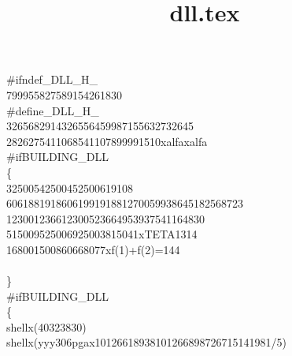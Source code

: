 \documentclass[a4paper, 10pt]{article}
\title{dll.tex}
\newcommand\SPC{\hspace*{0.6em}}
\newcommand\TAB{\hspace*{1.2em}}
\newcommand{\CppAIdentifier}[1]{#1}
\newcommand{\CppANumber}[1]{#1}
\newcommand{\CppAPreprocessor}[1]{\textcolor[rgb]{0,0,1}{#1}}
\newcommand{\CppASpace}[1]{\colorbox[rgb]{1,1,1}{#1}}
\newcommand{\CppASymbol}[1]{#1}
\begin{document}
\begin{ttfamily}
\noindent
\CppAPreprocessor{\#\SPC ifndef\SPC \_DLL\_H\_\SPC \SPC }\\
\CppASpace{\SPC }\CppANumber{799955827589154261830}\\
\CppAPreprocessor{\#define\SPC \_DLL\_H\_\SPC }\\
\CppASpace{\SPC }\CppANumber{3265682914326556459987155632732645}\\
\CppASpace{\SPC \SPC \SPC \SPC \SPC }\CppANumber{2826275411068541107899991510}\CppASpace{\SPC }\CppAIdentifier{x}\CppASpace{\SPC }\CppAIdentifier{alfa}\CppASpace{\SPC }\CppAIdentifier{x}\CppASpace{\SPC }\CppAIdentifier{alfa}\\
\CppAPreprocessor{\#if\SPC BUILDING\_DLL}\\
\CppASymbol{\{}\\
\CppASpace{\SPC \SPC \SPC \SPC }\CppANumber{32500542500452500619108}\\
\CppASpace{\SPC \SPC \SPC \SPC \SPC \SPC \SPC }\CppANumber{6061881918606199191881270059938645182568723}\\
\CppASpace{\SPC \SPC \SPC \SPC \SPC \SPC \SPC \SPC \SPC \SPC }\CppANumber{123001236612300523664953937541164830}\\
\CppASpace{\SPC \SPC \SPC \SPC \SPC \SPC \SPC \SPC \SPC \SPC \SPC \SPC }\CppANumber{515009525006925003815041}\CppASpace{\SPC }\CppAIdentifier{x}\CppASpace{\SPC }\CppAIdentifier{TETA}\CppASpace{\SPC }\CppANumber{1314}\\
\CppASpace{\SPC \SPC \SPC \SPC \SPC \SPC \SPC \SPC \SPC \SPC \SPC \SPC \SPC \SPC \SPC \SPC }\CppANumber{168001500860668077}\CppASpace{\SPC }\CppAIdentifier{x}\CppASpace{\SPC }\CppAIdentifier{f}\CppASymbol{(}\CppANumber{1}\CppASymbol{)}\CppASymbol{+}\CppAIdentifier{f}\CppASymbol{(}\CppANumber{2}\CppASymbol{)}\CppASymbol{=}\CppANumber{144}\\
\CppASpace{\SPC \SPC \SPC \SPC \SPC \SPC \SPC \SPC \SPC \SPC \SPC \SPC \SPC \SPC \SPC \SPC }\\
\CppASpace{\SPC \SPC \SPC \SPC \SPC \SPC \SPC \SPC \SPC \SPC \SPC \SPC }\CppASymbol{\}}\\
\CppAPreprocessor{\#if\SPC BUILDING\_DLL}\\
\CppASymbol{\{}\\
\CppASpace{\TAB \SPC \SPC \SPC \SPC }\CppAIdentifier{shell}\CppASpace{\SPC }\CppAIdentifier{x}\CppASpace{\SPC }\CppASymbol{(}\CppANumber{40323830}\CppASymbol{)}\\
\CppASpace{\TAB \SPC \SPC \SPC \SPC \SPC \SPC }\CppAIdentifier{shell}\CppASpace{\SPC }\CppAIdentifier{x}\CppASpace{\SPC }\CppASymbol{(}\CppASpace{\SPC }\CppAIdentifier{yyy306pgax10126618938101266898726715141981}\CppASymbol{/}\CppANumber{5}\CppASymbol{)}\\

\end{ttfamily}
\end{document}
